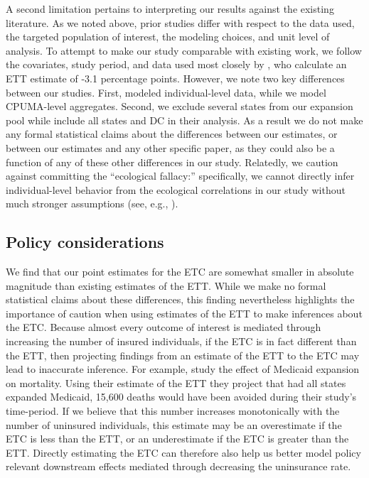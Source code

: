\documentclass[article]{imsart}
\theoremstyle{plain}
\theoremstyle{remark}
\begin{document}
A second limitation pertains to interpreting our results against the existing literature. As we noted above, prior studies differ with respect to the data used, the targeted population of interest, the modeling choices, and unit level of analysis. To attempt to make our study comparable with existing work, we follow the covariates, study period, and data used most closely by \cite{courtemanche2017early}, who calculate an ETT estimate of -3.1 percentage points. However, we note two key differences between our studies. First, \cite{courtemanche2017early} modeled individual-level data, while we model CPUMA-level aggregates. Second, we exclude several states from our expansion pool while \cite{courtemanche2017early} include all states and DC in their analysis. As a result we do not make any formal statistical claims about the differences between our estimates, or between our estimates and any other specific paper, as they could also be a function of any of these other differences in our study. Relatedly, we caution against committing the ``ecological fallacy:'' specifically, we cannot directly infer individual-level behavior from the ecological correlations in our study without much stronger assumptions (see, e.g., \cite{subramanian2009revisiting}).

\subsection{Policy considerations}

We find that our point estimates for the ETC are  somewhat smaller in absolute magnitude than existing estimates of the ETT. While we make no formal statistical claims about these differences, this finding nevertheless highlights the importance of caution when using estimates of the ETT to make inferences about the ETC. Because almost every outcome of interest is mediated through increasing the number of insured individuals, if the ETC is in fact different than the ETT, then projecting findings from an estimate of the ETT to the ETC may lead to inaccurate inference. For example, \cite{miller2019medicaid} study the effect of Medicaid expansion on mortality. Using their estimate of the ETT they project that had all states expanded Medicaid, 15,600 deaths would have been avoided during their study's time-period. If we believe that this number increases monotonically with the number of uninsured individuals, this estimate may be an overestimate if the ETC is less than the ETT, or an underestimate if the ETC is greater than the ETT. Directly estimating the ETC can therefore also help us better model policy relevant downstream effects mediated through decreasing the uninsurance rate. 
\end{document}
